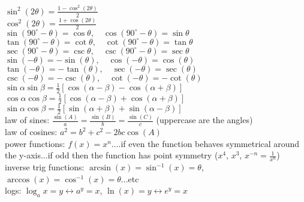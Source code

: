 \documentclass{article}
\begin{document}
$ \sin^2(2\theta) = \frac{1 - \cos^2(2\theta)}{2} $\\

$ \cos^2(2\theta) = \frac{1 + \cos(2\theta)}{2} $\\

$ \sin(90^\circ - \theta) = \cos \theta, \quad \cos(90^\circ - \theta) = \sin \theta $\\

$ \tan(90^\circ - \theta) = \cot \theta, \quad \cot(90^\circ - \theta) = \tan \theta $\\

$ \sec(90^\circ - \theta) = \csc \theta, \quad \csc(90^\circ - \theta) = \sec \theta $\\

$ \sin(-\theta) = -\sin(\theta), \quad \cos(-\theta) = \cos(\theta) $\\

$ \tan(-\theta) = -\tan(\theta), \quad \sec(-\theta) = \sec(\theta) $\\

$ \csc(-\theta) = -\csc(\theta), \quad \cot(-\theta) = -\cot(\theta) $\\

$ \sin \alpha \sin \beta = \frac{1}{2} [\cos(\alpha - \beta) - \cos(\alpha + \beta)] $\\

$ \cos \alpha \cos \beta = \frac{1}{2} [\cos(\alpha - \beta) + \cos(\alpha + \beta)] $\\

$ \sin \alpha \cos \beta = \frac{1}{2} [\sin(\alpha + \beta) + \sin(\alpha - \beta)] $\\

law of sines: $ \frac{\sin(A)}{a} = \frac{\sin(B)}{b} = \frac{\sin(C)}{c} $ (uppercase are the angles)\\

law of cosines: $ a^2 = b^2+c^2 - 2bc\cos(A) $\\

power functions: $f(x) = x^n$....if even the function behaves symmetrical around the y-axis...if odd then the function has point symmetry ($x^4$, $x^3$, $x^{-n} = \frac{1}{x^n}$)\\

inverse trig functions: $\arcsin(x) = \sin^{-1}(x) = \theta$, $\arccos(x) = \cos^{-1}(x) = \theta$...etc\\

logs: $\log_ax=y \leftrightarrow a^y = x$, $\ln(x)=y \leftrightarrow e^y=x$\\
\end{document}
